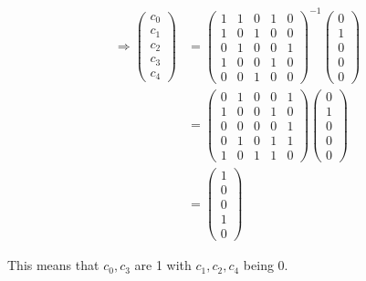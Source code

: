 \begin{enumerate}
\begin{align*}
\Rightarrow 
\begin{pmatrix}
c_0 \\ c_1 \\ c_2 \\ c_3 \\ c_4
\end{pmatrix}
&=
\begin{pmatrix}
1 & 1 & 0 & 1 & 0 \\
1 & 0 & 1 & 0 & 0 \\
0 & 1 & 0 & 0 & 1 \\
1 & 0 & 0 & 1 & 0 \\
0 & 0 & 1 & 0 & 0 
\end{pmatrix}^{-1}
\begin{pmatrix} 0 \\  1 \\ 0 \\ 0 \\ 0 \end{pmatrix} \\
&=
\begin{pmatrix}
0 & 1 & 0 & 0 & 1 \\
1 & 0 & 0 & 1 & 0 \\
0 & 0 & 0 & 0 & 1 \\
0 & 1 & 0 & 1 & 1 \\
1 & 0 & 1 & 1 & 0
\end{pmatrix}
\begin{pmatrix} 0 \\  1 \\ 0 \\ 0 \\ 0 \end{pmatrix} \\
&=
\begin{pmatrix} 1 \\  0 \\ 0 \\ 1 \\ 0 \end{pmatrix}
\end{align*}

This means that $c_0, c_3$ are 1 with $c_1, c_2, c_4$ being 0.


\end{enumerate}
